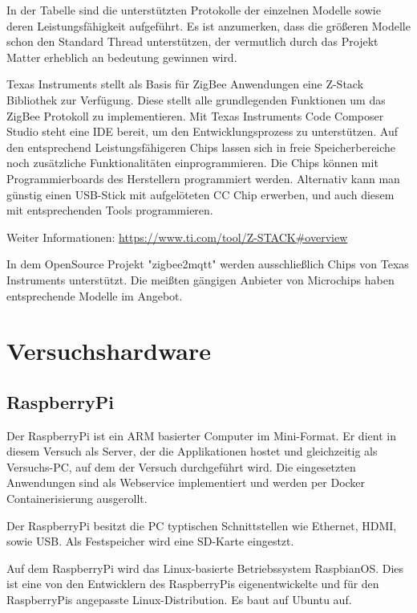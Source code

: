 In der Tabelle sind die unterstützten Protokolle der einzelnen Modelle sowie deren Leistungsfähigkeit aufgeführt.
Es ist anzumerken, dass die größeren Modelle schon den Standard Thread unterstützen, der vermutlich durch das
Projekt \grqq Matter\grqq{} erheblich an bedeutung gewinnen wird.

Texas Instruments stellt als Basis für ZigBee Anwendungen eine Z-Stack Bibliothek zur Verfügung. Diese stellt alle grundlegenden 
Funktionen um das ZigBee Protokoll zu implementieren. Mit Texas Instruments Code Composer Studio steht eine IDE bereit,
um den Entwicklungsprozess zu unterstützen. Auf den entsprechend Leistungsfähigeren Chips lassen sich in freie Speicherbereiche noch zusätzliche
Funktionalitäten einprogrammieren. Die Chips können mit Programmierboards des Herstellern programmiert werden. Alternativ kann man
günstig einen USB-Stick mit aufgelöteten CC Chip erwerben, und auch diesem mit entsprechenden Tools programmieren.

Weiter Informationen: \url{https://www.ti.com/tool/Z-STACK#overview}

In dem OpenSource Projekt "zigbee2mqtt" werden ausschließlich Chips von Texas Instruments unterstützt. Die meißten gängigen Anbieter von Microchips 
haben entsprechende Modelle im Angebot. 

\section{Versuchshardware}

\subsection{RaspberryPi}

Der RaspberryPi ist ein ARM basierter Computer im Mini-Format. Er dient in diesem Versuch als Server, der die Applikationen
hostet und gleichzeitig als Versuchs-PC, auf dem der Versuch durchgeführt wird. Die eingesetzten Anwendungen sind 
als Webservice implementiert und werden per Docker Containerisierung ausgerollt.

Der RaspberryPi besitzt die PC typtischen Schnittstellen wie Ethernet, HDMI, sowie USB. Als Festspeicher wird eine
SD-Karte eingestzt. 

Auf dem RaspberryPi wird das Linux-basierte Betriebssystem RaspbianOS. Dies ist eine von den Entwicklern des RaspberryPis eigenentwickelte und für den RaspberryPis
angepasste Linux-Distribution. Es baut auf Ubuntu auf.

